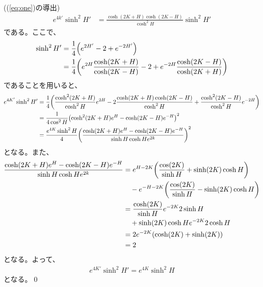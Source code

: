 \documentclass[a4paper,11pt]{jsarticle}
\numberwithin{equation}{section}
\begin{document}
((\ref{eq:one})の導出)\\
\begin{align}
    e^{4k'} \sinh^2 H' &= \frac{\cosh(2K+H) \cosh(2K-H)}{\cosh^2 H} \sinh^2 H'
\end{align}
である。ここで、
\begin{align}
    \sinh^2 H' &= \frac{1}{4} \qty(e^{2H'} -2 + e^{-2H'})\\
    &= \frac{1}{4} \qty(e^{2H}\frac{\cosh(2K+H)}{\cosh(2K-H)} -2 + e^{-2H}\frac{\cosh(2K-H)}{\cosh(2K+H)})
\end{align}
であることを用いると、
\begin{align}
    e^{4K'} \sinh^2 H' &= \frac{1}{4} \qty(\frac{\cosh^2(2K+H)}{\cosh^2 H}e^{2H} -2\frac{\cosh(2K+H)\cosh(2K-H)}{\cosh^2 H} + \frac{\cosh^2(2K-H)}{\cosh^2 H}e^{-2H})\\
    &= \frac{1}{4\cos^2 H} \qty(\cosh^2(2K+H)e^{H} -\cosh(2K-H)e^{-H})^2\\
    &= \frac{e^{4K}\sinh^2 H}{4} \qty(\frac{\cosh(2K+H)e^{H} - \cosh(2K-H)e^{-H}}{\sinh H \cosh H e^{2k}})^2
\end{align}
となる。また、
\begin{align}
    \frac{\cosh(2K+H)e^{H} - \cosh(2K-H)e^{-H}}{\sinh H \cosh H e^{2k}} &= e^{H-2K}\qty(\frac{\cos(2K)}{\sinh H} + {\sinh(2K)}\cosh H)\\
    &\quad -e^{-H-2K}\qty(\frac{\cos(2K)}{\sinh H} - {\sinh(2K)}\cosh H)\\
    &= \frac{\cosh(2K)}{\sinh H} e^{-2K} 2\sinh H \\
    &\quad+ \sinh(2K) \cosh H e^{-2K} 2\cosh H\\
    &= 2e^{-2K} (\cosh(2K) + \sinh(2K) )\\
    &= 2
\end{align}
となる。よって、
\begin{align}
    e^{4K'} \sinh^2 H' = e^{4K} \sinh^2 H
\end{align}
となる。\qed\\
\end{document}
